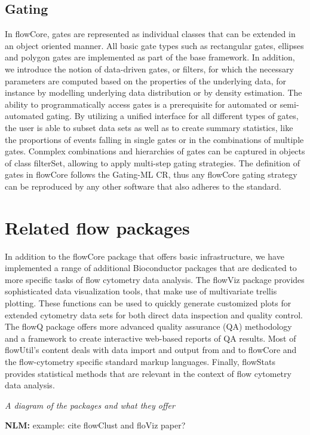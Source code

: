 \documentclass[12pt]{article}
\begin{document}
\subsection*{Gating}
In flowCore, gates are represented as individual classes that can be
extended in an object oriented manner. All basic gate types such as
rectangular gates, ellipses and polygon gates are implemented as part
of the base framework. In addition, we introduce the notion of
data-driven gates, or filters, for which the necessary parameters are
computed based on the properties of the underlying data, for instance
by modelling underlying data distribution or by density
estimation. The ability to programmatically access gates is a
prerequisite for automated or semi-automated gating. By utilizing a
unified interface for all different types of gates, the user is able
to subset data sets as well as to create summary statistics, like the
proportions of events falling in single gates or in the combinations
of multiple gates. Conmplex combinations and hierarchies of gates can
be captured in objects of class filterSet, allowing to apply
multi-step gating strategies. The definition of gates in flowCore
follows the Gating-ML CR, thus any flowCore gating strategy can be
reproduced by any other software that also adheres to the standard.

\section{Related flow packages}
In addition to the flowCore package that offers basic infrastructure,
we have implemented a range of additional Bioconductor packages that
are dedicated to more specific tasks of flow cytometry data
analysis. The flowViz package provides sophisticated data
visualization tools, that make use of multivariate trellis
plotting. These functions can be used to quickly generate customized
plots for extended cytometry data sets for both direct data inspection
and quality control. The flowQ package offers more advanced quality
assurance (QA) methodology and a framework to create interactive
web-based reports of QA results. Most of flowUtil's content deals with
data import and output from and to flowCore and the flow-cytometry
specific standard markup languages. Finally, flowStats provides
statistical methods that are relevant in the context of flow cytometry
data analysis.

\textit{A diagram of the packages and what they offer}

{\bf NLM:} example: cite flowClust and floViz paper?
\end{document}

